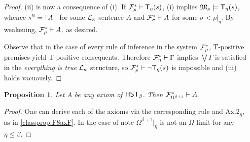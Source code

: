 \documentclass[UKenglish,cleveref,DIV=12]{scrartcl}
\newtheorem{proposition}[lemma]{Proposition}
\newtheorem{corollary}[lemma]{Corollary}
\theoremstyle{definition}
\theoremstyle{definition}
\begin{document}
\begin{proof}
(ii) is now a consequence of (i). If $\mathcal{F}^*_\rho\vdash \mathsf{T}_\eta(s)$, (i) implies
$\mathfrak{M}_\rho\models \mathsf{T}_\eta(s)$, whence $s^\mathbb N=\ulcorner{A}\urcorner$ for some
$\mathcal{L}_\kappa$-sentence $A$ and $\mathcal{F}^*_\sigma\vdash A$ for some
$\sigma<\rho|_\eta$. By weakening, $\mathcal{F}^*_\rho\vdash A$, as desired.

Observe that in the case of every rule of inference in the system $\mathcal{F}^*_\rho$, T-positive
premises yield T-positive consequents. Therefore $\mathcal{F}^*_\eta\vdash\Gamma$ implies $\bigvee\Gamma$
is satisfied in the {\em everything is true} $\mathcal{L}_\kappa$ structure, so
$\mathcal{F}^*_\rho\vdash\lnot \mathsf{T}_\eta(s)$ is impossible and (iii) holds vacuously.
\end{proof}

\begin{proposition}\label{extprop:FFembed}
 Let $A$ be any axiom of $\mathsf{HST}_\beta$. Then $\mathcal{F}^*_{\Omega^{\beta+1}}\vdash A$.
\end{proposition}
\begin{proof}
 One can derive each of the axioms via the corresponding rule and Ax.2$_\eta$, as in \cref{classprop:F8axF}. In the case of \Uni\eta note $\Omega^{\beta+1}|_\eta$ is not an $\Omega$-limit for any $\eta\le\beta$.
\end{proof}
\end{document}
